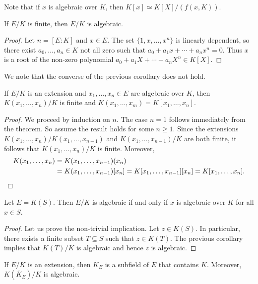 Note that if $x$ is algebraic over $K$, then
$K[x]\simeq K[X]/(f(x,K))$. 

\begin{corollary}
	If $E/K$ is finite, then $E/K$ is algebraic. 
\end{corollary}

\begin{proof}
	Let $n=[E:K]$ and $x\in E$. The set $\{1,x,\dots,x^n\}$ is linearly dependent, 
	so there exist $a_0,\dots,a_n\in K$ not all zero such that
	$a_0+a_1x+\cdots+a_nx^n=0$. Thus $x$ is a root of the non-zero
	polynomial $a_0+a_1X+\cdots+a_nX^n\in K[X]$. 
\end{proof}

We note that the converse of the previous corollary does not hold. 

\begin{corollary}
	If $E/K$ is an extension and $x_1,\dots,x_n\in E$ 
	are algebraic over $K$, then 
	$K(x_1,\dots,x_n)/K$ is finite and
	$K(x_1,\dots,x_m)=K[x_1,\dots,x_n]$. 
\end{corollary}

\begin{proof}
	We proceed by induction on $n$. The case $n=1$ follows immediately from 
	the theorem. So assume the result holds for some $n\geq1$. Since the extensions 
	$K(x_1,\dots,x_n)/K(x_1,\dots,x_{n-1})$ and $K(x_1,\dots,x_{n-1})/K$ are
	both finite, it follows that $K(x_1,\dots,x_n)/K$ is finite. Moreover, 
	\begin{align*}
	K(x_1,\dots,x_n)&=K(x_1,\dots,x_{n-1})(x_n)\\
	&=K(x_1,\dots,x_{n-1})[x_n]=K[x_1,\dots,x_{n-1}][x_n]=K[x_1,\dots,x_n].\qedhere
    \end{align*}
\end{proof}

\begin{corollary}
	Let $E=K(S)$. Then $E/K$ is algebraic if and only if
	$x$ is algebraic over $K$ for all $x\in S$. 
\end{corollary}

\begin{proof}
	Let us prove the non-trivial implication. Let $z\in K(S)$. In particular, 
	there exists a finite subset $T\subseteq S$ such that 
	$z\in K(T)$. The previous corollary implies that $K(T)/K$ is algebraic and
	hence $z$ is algebraic. 
\end{proof}

\begin{corollary}
	If $E/K$ is  an extension, then $\overline{K}_E$ 
	is a subfield of $E$ that contains $K$. Moreover, 
	$K(\overline{K}_E)/K$ is algebraic. 
\end{corollary}	


